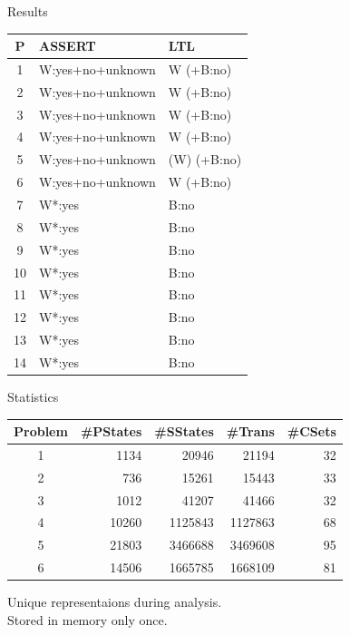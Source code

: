 \begin{frame}{Results}
\begin{center}
\vspace{-0.2cm}
\begin{tabular}{|c|l|l|}\hline
P & ASSERT & LTL \\\hline\hline
1 & W:yes+no+unknown      & W (+B:no)\\\hline
2 & W:yes+no+unknown     & W (+B:no)\\\hline
3 & W:yes+no+unknown     & W (+B:no)\\\hline
4 & W:yes+no+unknown     & W (+B:no)\\\hline
5 & W:yes+no+unknown     & (W) (+B:no)\\\hline
6 & W:yes+no+unknown     & W (+B:no) \\\hline
7 & W*:yes     & B:no    \\\hline
8 & W*:yes     & B:no    \\\hline
9 & W*:yes     & B:no    \\\hline
10 & W*:yes     & B:no    \\\hline
11 & W*:yes     & B:no    \\\hline
12 & W*:yes     & B:no    \\\hline
13 & W*:yes     & B:no    \\\hline
14 & W*:yes     & B:no    \\\hline
\end{tabular}
\end{center}
\end{frame}

\begin{frame}{Statistics}
\begin{center}
\begin{tabular}{|c|r|r|r|r|}\hline
Problem & \#PStates &\#SStates &\#Trans &\#CSets \\\hline\hline
1 &1134 & 20946 & 21194 & 32 \\\hline
2 &736 & 15261 & 15443 & 33 \\\hline
3 &1012 & 41207 & 41466 & 32 \\\hline
4 &10260 & 1125843 & 1127863 & 68 \\\hline
5 &21803 & 3466688 & 3469608 & 95 \\\hline
6 &14506 & 1665785 & 1668109 & 81 \\\hline
\end{tabular}

\vspace{0.6cm}
Unique representaions during analysis.\\
Stored in memory only once.
\end{center}
\end{frame}

